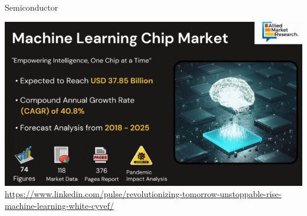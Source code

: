 \documentclass[aspectratio=169,xcolor=dvipsnames,svgnames,x11names,fleqn]{beamer}
\begin{document}
\begin{frame}{Semiconductor}
  \begin{center}
    \includegraphics[width=.55\textwidth]{figures/semiconductor_AI.png}\\
    {\color{MediumRed}\url{https://www.linkedin.com/pulse/revolutionizing-tomorrow-unstoppable-rise-machine-learning-white-cyvef/}}
  \end{center}
\end{frame}
\end{document}
